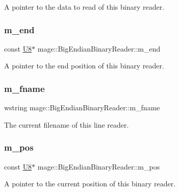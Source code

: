 A pointer to the data to read of this binary reader. \hypertarget{classmage_1_1_big_endian_binary_reader_ab4f707d30799b98afed0f9adfc27a3e2}{}\label{classmage_1_1_big_endian_binary_reader_ab4f707d30799b98afed0f9adfc27a3e2} 
\subsubsection{\texorpdfstring{m\+\_\+end}{m\_end}}
{\footnotesize\ttfamily const \hyperlink{namespacemage_afc638980bc6154f15af5e2d93a0e0ea9}{U8}$\ast$ mage\+::\+Big\+Endian\+Binary\+Reader\+::m\+\_\+end\hspace{0.3cm}{\ttfamily [private]}}

A pointer to the end position of this binary reader. \hypertarget{classmage_1_1_big_endian_binary_reader_a0f836aec582a59f156b64bffb9653e41}{}\label{classmage_1_1_big_endian_binary_reader_a0f836aec582a59f156b64bffb9653e41} 
\subsubsection{\texorpdfstring{m\+\_\+fname}{m\_fname}}
{\footnotesize\ttfamily wstring mage\+::\+Big\+Endian\+Binary\+Reader\+::m\+\_\+fname\hspace{0.3cm}{\ttfamily [private]}}

The current filename of this line reader. \hypertarget{classmage_1_1_big_endian_binary_reader_a7dbfc5ce1712e431f75d80a4f7a56e33}{}\label{classmage_1_1_big_endian_binary_reader_a7dbfc5ce1712e431f75d80a4f7a56e33} 
\subsubsection{\texorpdfstring{m\+\_\+pos}{m\_pos}}
{\footnotesize\ttfamily const \hyperlink{namespacemage_afc638980bc6154f15af5e2d93a0e0ea9}{U8}$\ast$ mage\+::\+Big\+Endian\+Binary\+Reader\+::m\+\_\+pos\hspace{0.3cm}{\ttfamily [private]}}

A pointer to the current position of this binary reader. 